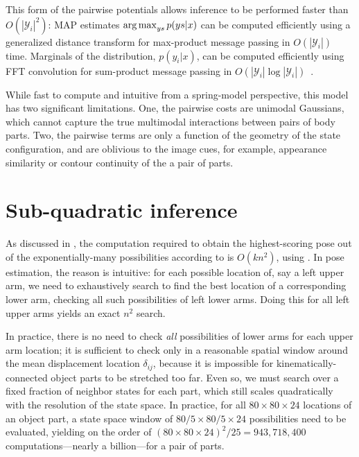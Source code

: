 {This form of the pairwise potentials allows inference to be performed faster than $O(|\mathcal{Y}_i|^2)$:  MAP estimates $\mathop{\arg\max}_{ys} p(ys | x)$ can be computed efficiently using a generalized distance transform for max-product message passing in $O(|\mathcal{Y}_i|)$ time.  Marginals of the distribution, $p(y_i | x)$, can be computed efficiently using FFT convolution for sum-product message passing in $O(|\mathcal{Y}_i| \log |\mathcal{Y}_i|)$~\cite{felz05}.

While fast to compute and intuitive from a spring-model perspective, this model has two significant limitations.  One, the pairwise costs are unimodal Gaussians, which cannot capture the true multimodal interactions between pairs of body parts.  Two, the pairwise terms are only a function of the geometry of the state configuration, and are oblivious to the image cues, for example, appearance similarity or contour continuity of the a pair of parts.
}

\section{Sub-quadratic inference}\label{sec:dt}

As discussed in , the computation required to obtain the 
highest-scoring pose out of the exponentially-many possibilities according to 
 is $O(kn^2)$, using .  In pose 
estimation, the reason is intuitive: for each possible location of, say a left 
upper arm, we need to exhaustively search to find the best location of a 
corresponding lower arm, checking all such possibilities of left lower arms.  
Doing this for all left upper arms yields an exact $n^2$ search.

In practice, there is no need to check {\em all} possibilities of lower arms 
for each upper arm location; it is sufficient to check only in a reasonable 
spatial window around the mean displacement location $\delta_{ij}$, because it 
is impossible for kinematically-connected object parts to be stretched too far.  
Even so, we must search over a fixed fraction of neighbor states for each part, 
which still scales quadratically with the resolution of the state space. In 
practice, for all $80 \times 80 \times 24$ locations of an object part, a state 
space window of $80/5 \times 80/5 \times 24$ possibilities need to be 
evaluated, yielding on the order of $ (80\times 80 \times 24)^2 / 25 = 
943,718,400$ computations---nearly a billion---for a pair of parts.

